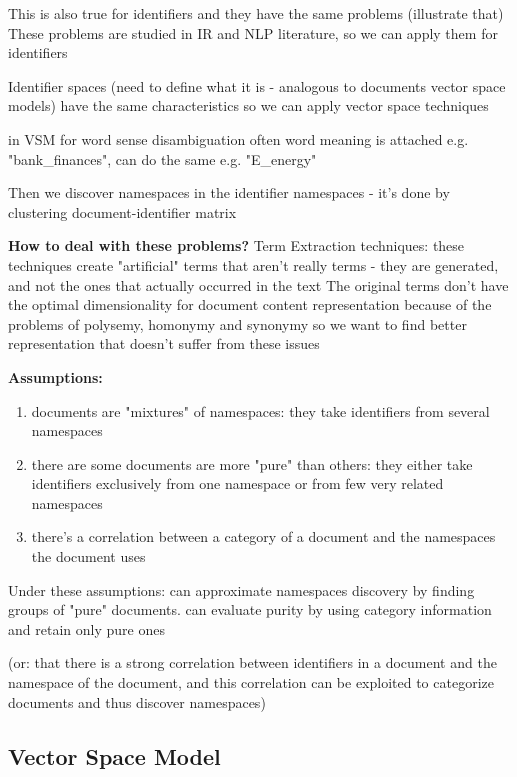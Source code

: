 This is also true for identifiers and they have the same problems (illustrate that)
These problems are studied in IR and NLP literature, so we can apply them for identifiers


Identifier spaces (need to define what it is - analogous to documents vector space models) have the same characteristics so we can apply vector space techniques

in VSM for word sense disambiguation often word meaning is attached e.g. "bank\_finances", can do the same e.g. "E\_energy"

Then we discover namespaces in the identifier namespaces - it's done by clustering document-identifier matrix


\textbf{How to deal with these problems?} Term Extraction techniques:
these techniques create "artificial" terms that aren't really terms - they are generated, and not the ones that actually occurred in the text
The original terms don't have the optimal dimensionality for document content representation
because of the problems of polysemy, homonymy and synonymy
so we want to find better representation that doesn't suffer from these issues


\textbf{Assumptions:}


\begin{enumerate}
 \item documents are "mixtures" of namespaces: they take identifiers from several namespaces
 \item there are some documents are more "pure" than others: they either take identifiers exclusively from one namespace or from few very related namespaces
 \item there's a correlation between a category of a document and the namespaces
the document uses
\end{enumerate}




Under these assumptions: can approximate namespaces discovery by finding groups of "pure" documents. can evaluate purity by using category information and retain only pure ones

(or: that there is a strong correlation between identifiers in
a document and the namespace of the document, and this correlation can be exploited to
categorize documents and thus discover namespaces)



\subsection{Vector Space Model} \label{sec:vsm}

